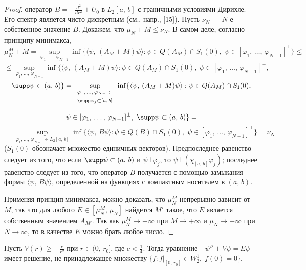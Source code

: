 \documentclass[a4paper
]{article}
\begin{document}
\begin{proof}
оператор $B=-\frac{d^2}{dr^2}+U_0$ в $L_2[a, \, b]$ с граничными
условиями Дирихле. Его спектр является чисто дискретным (см.,
напр., [15]). Пусть $\nu_N$ --- $N$-е собственное значение $B$.
Докажем, что $\mu_N+M\le \nu_N$. В самом деле, согласно принципу
минимакса, $$\mu_N^M+M=\sup_{\varphi_1, \, \dots, \,
\varphi_{N-1}} \inf \{\langle \psi, \, (A_M+M)\psi\rangle:\psi\in
Q(A_M)\cap S_1(0), \; \psi\in [\varphi_1, \, \dots, \,
\varphi_{N-1}]^{\bot}\} \le$$ $$\le \sup_{\varphi_1, \, \dots, \,
\varphi_{N-1}} \inf \{\langle \psi, \, (A_M+M)\psi\rangle:\psi\in
Q(A_M)\cap S_1(0), \; \psi\in [\varphi_1, \, \dots, \,
\varphi_{N-1}]^{\bot}, $$$$ \supp \psi\subset (a, \, b)\}=
\sup_{\begin{array}{l} ^{\varphi_1, \, \dots, \, \varphi_{N-1}:}\\
^{\supp \varphi_j\subset [a, \, b]}\end{array}}\inf \{\langle
\psi, \, (A_M+M)\psi\rangle:\psi\in Q(A_M)\cap S_1(0), $$$$
\psi\in [\varphi_1, \, \dots, \, \varphi_{N-1}]^{\bot}, \; \supp
\psi\subset (a, \, b)\}=$$
$$=\sup_{\varphi_1, \, \dots, \, \varphi_{N-1}\in L_2[a, \, b]}
\inf \{\langle \psi, \, B\psi\rangle:\psi\in Q(B)\cap S_1(0), \;
\psi\in [\varphi_1, \, \dots, \, \varphi_{N-1}]^{\bot}\}=\nu_N$$
($S_1(0)$ обозначает множество единичных векторов).
Предпоследнее равенство следует из того, что если $\supp \psi\subset
(a, \, b)$ и $\psi\bot \varphi_j$, то $\psi\bot (\chi_{[a, \, b]}
\varphi_j)$; последнее равенство следует из того, что оператор
$B$ получается с помощью замыкания формы $\langle \psi, \, B\psi
\rangle$, определенной на функциях с компактным носителем в $(a, \,
b)$. \par
Применяя принцип минимакса, можно доказать, что $\mu_N^M$ непрерывно
зависит от $M$, так что для любого $E\in [\mu_N^M, \, \mu_N]$ найдется $M'$
такое, что $E$ является собственным значением $A_{M'}$. Так как
$\mu_N^M\rightarrow -\infty$ при $M\rightarrow +\infty$ и $\mu_N\rightarrow
+\infty$ при $N\rightarrow \infty$, то в качестве $E$ можно брать
любое число.
\end{proof}
\begin{Lem}
\label{uniqueness_lemma}
Пусть $V(r)\ge -\frac{c}{r^2}$ при $r\in (0, \, r_0]$, где $c<\frac14$.
Тогда уравнение $-\psi''+V\psi=E\psi$ имеет решение, не принадлежащее
множеству $\{f:f|_{[0, \, r_0]}\in W^1_2, \; f(0)=0\}$.
\end{Lem}
\end{document}
